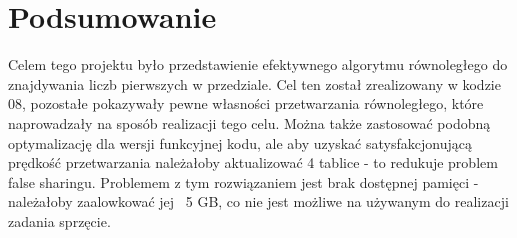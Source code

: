 \documentclass[12pt]{article}
\begin{document}
\section{Podsumowanie}
	Celem tego projektu było przedstawienie efektywnego algorytmu równoległego do znajdywania liczb pierwszych w przedziale. Cel ten został zrealizowany w kodzie 08, pozostałe pokazywały pewne własności przetwarzania równoległego, które naprowadzały na sposób realizacji tego celu. Można także zastosować podobną optymalizację dla wersji funkcyjnej kodu, ale aby uzyskać satysfakcjonującą prędkość przetwarzania należałoby aktualizować 4 tablice - to redukuje problem false sharingu. Problemem z tym rozwiązaniem jest brak dostępnej pamięci - należałoby zaalowkować jej ~5 GB, co nie jest możliwe na używanym do realizacji zadania sprzęcie.
\end{document}
